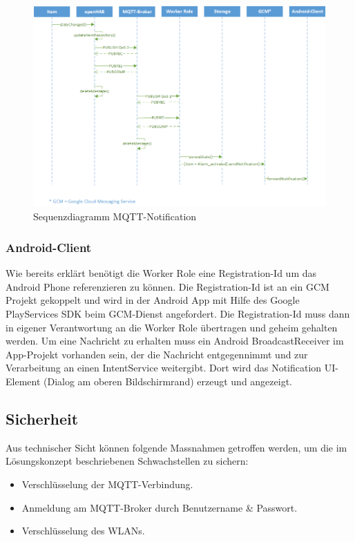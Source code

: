 \begin{figure}[H]
	\centering
		\includegraphics[scale=0.65]{report/img/sequenzDiagramNotification}
	\caption{Sequenzdiagramm MQTT-Notification}
	\label{fig:sequenzNotification}
\end{figure}

\subsubsection{Android-Client}
Wie bereits erklärt benötigt die Worker Role eine Registration-Id um das Android Phone referenzieren zu können. Die Registration-Id ist an ein GCM Projekt gekoppelt und wird in der Android App mit Hilfe des Google PlayServices SDK beim GCM-Dienst angefordert. Die Registration-Id muss dann in eigener Verantwortung an die Worker Role übertragen und geheim gehalten werden. Um eine Nachricht zu erhalten muss ein Android BroadcastReceiver im App-Projekt vorhanden sein, der die Nachricht entgegennimmt und zur Verarbeitung an einen IntentService weitergibt. Dort wird das Notification UI-Element (Dialog am oberen Bildschirmrand) erzeugt und angezeigt.

\subsection{Sicherheit}
Aus technischer Sicht können folgende Massnahmen getroffen werden, um die im Lösungskonzept beschriebenen Schwachstellen zu sichern:
\begin{itemize}
	\item Verschlüsselung der MQTT-Verbindung.
	\item Anmeldung am MQTT-Broker durch Benutzername \& Passwort.
	\item Verschlüsselung des WLANs.
\end{itemize}

